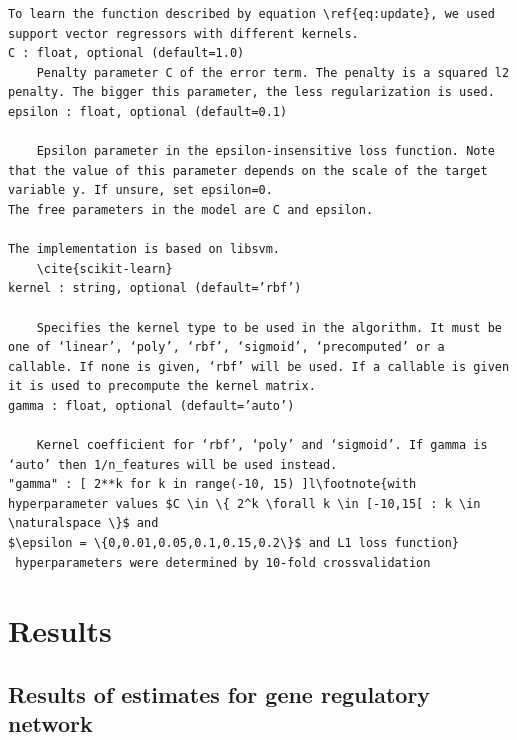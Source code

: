 \cite{Smola2004}
\begin{verbatim}
To learn the function described by equation \ref{eq:update}, we used support vector regressors with different kernels. 
C : float, optional (default=1.0)
    Penalty parameter C of the error term. The penalty is a squared l2 penalty. The bigger this parameter, the less regularization is used.
epsilon : float, optional (default=0.1)

    Epsilon parameter in the epsilon-insensitive loss function. Note that the value of this parameter depends on the scale of the target variable y. If unsure, set epsilon=0.
The free parameters in the model are C and epsilon.

The implementation is based on libsvm.
    \cite{scikit-learn}
kernel : string, optional (default=’rbf’)

    Specifies the kernel type to be used in the algorithm. It must be one of ‘linear’, ‘poly’, ‘rbf’, ‘sigmoid’, ‘precomputed’ or a callable. If none is given, ‘rbf’ will be used. If a callable is given it is used to precompute the kernel matrix.
gamma : float, optional (default=’auto’)

    Kernel coefficient for ‘rbf’, ‘poly’ and ‘sigmoid’. If gamma is ‘auto’ then 1/n_features will be used instead.
"gamma" : [ 2**k for k in range(-10, 15) ]l\footnote{with hyperparameter values $C \in \{ 2^k \forall k \in [-10,15[ : k \in \naturalspace \}$ and 
$\epsilon = \{0,0.01,0.05,0.1,0.15,0.2\}$ and L1 loss function}
 hyperparameters were determined by 10-fold crossvalidation
 \end{verbatim}


\section{Results}
\subsection{Results of estimates for gene regulatory network}
